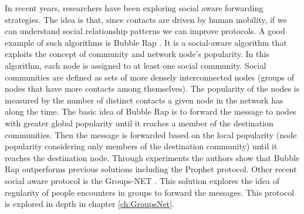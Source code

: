 In recent years, researchers have been exploring social aware forwarding strategies. The idea is that, since contacts are driven by human mobility, if we can understand social relationship
patterns we can improve protocols. A good example of such algorithms is Bubble Rap \cite{hui2011bubble}. It is a social-aware algorithm that exploits the concept of community and network
node’s popularity. In this algorithm, each node is assigned to at least one social community. Social communities are defined as sets of more densely interconnected nodes
(groups of nodes that have more contacts among themselves). The popularity of the nodes is measured by the number of distinct contacts a given node in the network has along the time.
The basic idea of Bubble Rap is to forward the message to nodes with greater global popularity until it reaches a member of the destination communities. Then the message is forwarded
based on the local popularity (node popularity considering only members of the destination community) until it reaches the destination node. Through experiments the authors show that
Bubble Rap outperforms previous solutions including the Prophet protocol. Other recent social aware protocol is the Groups-NET \cite{nunes2016groups}. This solution explores the idea of
regularity of people encounters in groups to forward the messages. This protocol is explored in depth in chapter \ref{ch:GroupsNet}.